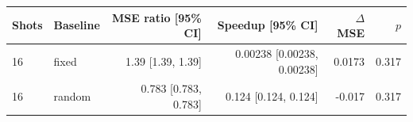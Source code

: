\begin{tabular}{llrrrr}
\toprule
Shots & Baseline & MSE ratio [95\% CI] & Speedup [95\% CI] & $\Delta$MSE & $p$ \\
\midrule
16 & fixed & 1.39 [1.39, 1.39] & 0.00238 [0.00238, 0.00238] & 0.0173 & 0.317 \\
16 & random & 0.783 [0.783, 0.783] & 0.124 [0.124, 0.124] & -0.017 & 0.317 \\
\bottomrule
\end{tabular}
